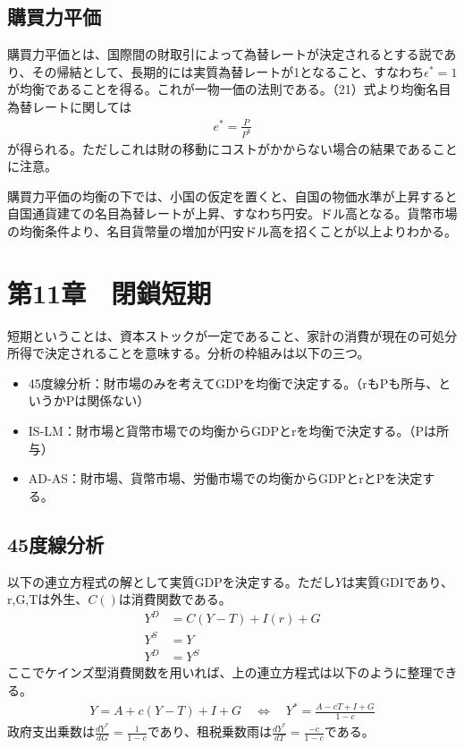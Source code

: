 \documentclass{jsarticle}
\begin{document}
\subsection{購買力平価}
購買力平価とは、国際間の財取引によって為替レートが決定されるとする説であり、その帰結として、長期的には実質為替レートが1となること、すなわち$\epsilon^* = 1$が均衡であることを得る。これが一物一価の法則である。（21）式より均衡名目為替レートに関しては
\begin{align}
	e^* = \frac{P}{P^{\$}}
\end{align}
が得られる。ただしこれは財の移動にコストがかからない場合の結果であることに注意。

購買力平価の均衡の下では、小国の仮定を置くと、自国の物価水準が上昇すると自国通貨建ての名目為替レートが上昇、すなわち円安。ドル高となる。貨幣市場の均衡条件より、名目貨幣量の増加が円安ドル高を招くことが以上よりわかる。

\section{第11章　閉鎖短期}
短期ということは、資本ストックが一定であること、家計の消費が現在の可処分所得で決定されることを意味する。分析の枠組みは以下の三つ。
\begin{itemize}
\item 45度線分析：財市場のみを考えてGDPを均衡で決定する。（rもPも所与、というかPは関係ない）
\item IS-LM：財市場と貨幣市場での均衡からGDPとrを均衡で決定する。（Pは所与）
\item AD-AS：財市場、貨幣市場、労働市場での均衡からGDPとrとPを決定する。
\end{itemize}

\subsection{45度線分析}
以下の連立方程式の解として実質GDPを決定する。ただし$Y$は実質GDIであり、r,G,Tは外生、$C( )$は消費関数である。
\begin{align*}
	Y^D &= C(Y - T) + I(r) + G \\
	Y^S &= Y\\
	Y^D &= Y^S
\end{align*}
ここでケインズ型消費関数を用いれば、上の連立方程式は以下のように整理できる。
\begin{align}
	Y = A + c(Y - T) + I + G \quad \Leftrightarrow\quad Y^* = \frac{A - cT + I + G}{1 -c}
\end{align}
政府支出乗数は$\frac{d Y^*}{dG} = \frac{1}{1 -c}$であり、租税乗数雨は$\frac{dY^*}{dT} = \frac{-c}{1-c}$である。
\end{document}
